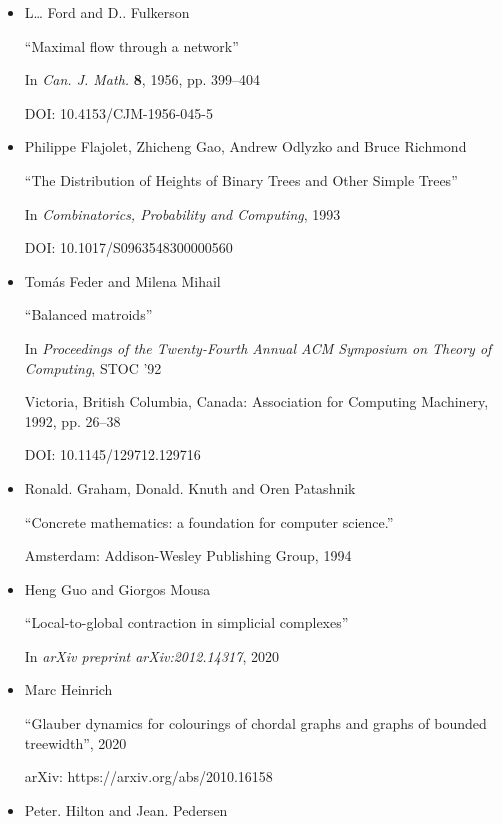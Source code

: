 \begin{itemize}
      

\item[] [FF56]
L… Ford and D.. Fulkerson

“Maximal flow through a network”

In \emph{Can. J. Math.} \textbf{8}, 1956, pp. 399–404

DOI: 10.4153/CJM-1956-045-5


      

\item[] [Fla+93]
Philippe Flajolet, Zhicheng Gao, Andrew Odlyzko and Bruce Richmond

“The Distribution of Heights of Binary Trees and Other Simple Trees”

In \emph{Combinatorics, Probability and Computing}, 1993

DOI: 10.1017/S0963548300000560


      

\item[] [FM92]
Tomás Feder and Milena Mihail

“Balanced matroids”

In \emph{Proceedings of the Twenty-Fourth Annual ACM Symposium on Theory of Computing}, STOC ’92

Victoria, British Columbia, Canada: Association for Computing Machinery, 1992, pp. 26–38

DOI: 10.1145/129712.129716


      

\item[] [GKP94]
Ronald. Graham, Donald. Knuth and Oren Patashnik

“Concrete mathematics: a foundation for computer science.”

Amsterdam: Addison-Wesley Publishing Group, 1994


      

\item[] [GM20]
Heng Guo and Giorgos Mousa

“Local-to-global contraction in simplicial complexes”

In \emph{arXiv preprint arXiv:2012.14317}, 2020


      

\item[] [Hei20]
Marc Heinrich

“Glauber dynamics for colourings of chordal graphs and graphs of bounded treewidth”, 2020

arXiv: https://arxiv.org/abs/2010.16158


      

\item[] [HP91]
Peter. Hilton and Jean. Pedersen


\end{itemize}
